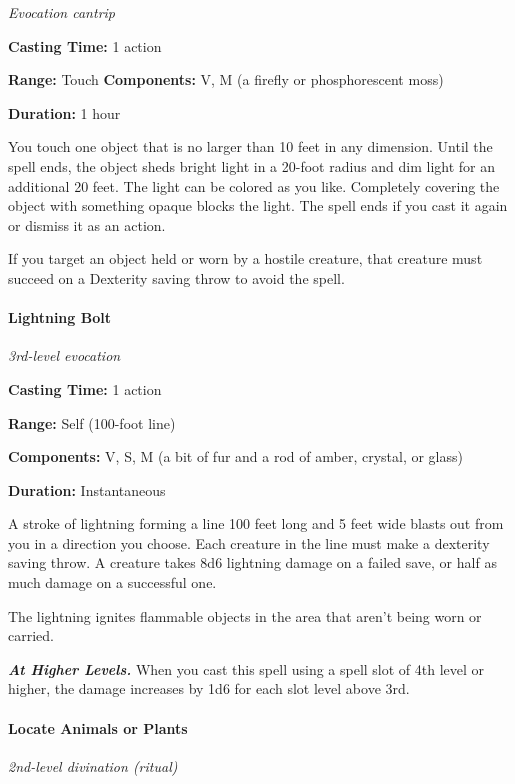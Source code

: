 \documentclass[
]{article}
\begin{document}
\emph{Evocation cantrip}

\textbf{Casting Time:} 1 action

\textbf{Range:} Touch \textbf{Components:} V, M (a firefly or
phosphorescent moss)

\textbf{Duration:} 1 hour

You touch one object that is no larger than 10 feet in any dimension.
Until the spell ends, the object sheds bright light in a 20-foot radius
and dim light for an additional 20 feet. The light can be colored as you
like. Completely covering the object with something opaque blocks the
light. The spell ends if you cast it again or dismiss it as an action.

If you target an object held or worn by a hostile creature, that
creature must succeed on a Dexterity saving throw to avoid the spell.

\hypertarget{lightning-bolt}{%
\paragraph{Lightning Bolt}\label{lightning-bolt}}

\emph{3rd-level evocation}

\textbf{Casting Time:} 1 action

\textbf{Range:} Self (100-foot line)

\textbf{Components:} V, S, M (a bit of fur and a rod of amber, crystal,
or glass)

\textbf{Duration:} Instantaneous

A stroke of lightning forming a line 100 feet long and 5 feet wide
blasts out from you in a direction you choose. Each creature in the line
must make a dexterity saving throw. A creature takes 8d6 lightning
damage on a failed save, or half as much damage on a successful one.

The lightning ignites flammable objects in the area that aren't being
worn or carried.

\emph{\textbf{At Higher Levels.}} When you cast this spell using a spell
slot of 4th level or higher, the damage increases by 1d6 for each slot
level above 3rd.

\hypertarget{locate-animals-or-plants}{%
\paragraph{Locate Animals or Plants}\label{locate-animals-or-plants}}

\emph{2nd-level divination (ritual)}
\end{document}
